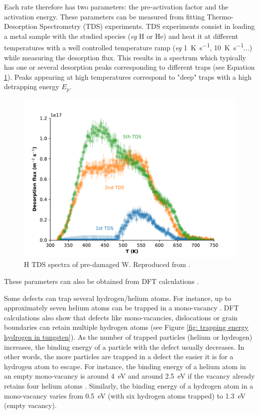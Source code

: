 Each rate therefore has two parameters: the pre-activation factor and the activation energy.
These parameters can be measured from fitting Thermo-Desorption Spectrometry (TDS) experiments.
TDS experiments consist in loading a metal sample with the studied species (\textit{eg} H or He) and heat it at different temperatures with a well controlled temperature ramp (\textit{eg} \SI{1}{K.s^{-1}}, \SI{10}{K.s^{-1}}...) while measuring the desorption flux.
This results in a spectrum which typically has one or several desorption peaks corresponding to different traps (see Equation \ref{fig: TDS example ialovega}).
Peaks appearing at high temperatures correspond to "deep" traps with a high detrapping energy $E_p$.

\begin{figure} [h!]
    \centering
    \includegraphics[width=\linewidth]{Figures/Chapter1/tds_helium_nicolas.pdf}
    \caption{H TDS spectra of pre-damaged W. Reproduced from \cite{ialovega_hydrogen_2020}.}
    \label{fig: TDS example ialovega}
\end{figure}

These parameters can also be obtained from DFT calculations .

Some defects can trap several hydrogen/helium atoms.
For instance, up to approximately seven helium atoms can be trapped in a mono-vacancy .
DFT calculations also show that defects like mono-vacancies, dislocations or grain boundaries can retain multiple hydrogen atoms (see Figure \ref{fig: trapping energy hydrogen in tungsten}).
As the number of trapped particles (helium or hydrogen) increases, the binding energy of a particle with the defect usually decreases.
In other words, the more particles are trapped in a defect the easier it is for a hydrogen atom to escape.
For instance, the binding energy of a helium atom in an empty mono-vacancy is around \SI{4}{eV} and around \SI{2.5}{eV} if the vacancy already retains four helium atoms \cite{faney_spatially_2015}.
Similarly, the binding energy of a hydrogen atom in a mono-vacancy varies from \SI{0.5}{eV} (with six hydrogen atoms trapped) to \SI{1.3}{eV} (empty vacancy).

